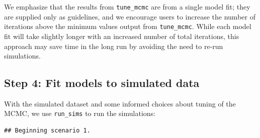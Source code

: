 \documentclass[
]{article}
\newenvironment{Shaded}{\begin{snugshade}}{\end{snugshade}}
\newcommand{\AttributeTok}[1]{\textcolor[rgb]{0.13,0.29,0.53}{#1}}
\newcommand{\CommentTok}[1]{\textcolor[rgb]{0.56,0.35,0.01}{\textit{#1}}}
\newcommand{\ConstantTok}[1]{\textcolor[rgb]{0.56,0.35,0.01}{#1}}
\newcommand{\DecValTok}[1]{\textcolor[rgb]{0.00,0.00,0.81}{#1}}
\newcommand{\FunctionTok}[1]{\textcolor[rgb]{0.13,0.29,0.53}{\textbf{#1}}}
\newcommand{\NormalTok}[1]{#1}
\newcommand{\OtherTok}[1]{\textcolor[rgb]{0.56,0.35,0.01}{#1}}
\newcommand{\SpecialCharTok}[1]{\textcolor[rgb]{0.81,0.36,0.00}{\textbf{#1}}}
\newcommand{\StringTok}[1]{\textcolor[rgb]{0.31,0.60,0.02}{#1}}
\begin{document}
We emphasize that the results from \texttt{tune\_mcmc} are from a single model fit; they are supplied only as guidelines, and we encourage users to increase the number of iterations above the minimum values output from \texttt{tune\_mcmc}. While each model fit will take slightly longer with an increased number of total iterations, this approach may save time in the long run by avoiding the need to re-run simulations.

\subsection{\texorpdfstring{Step 4: Fit models to simulated data \label{runSims}}{Step 4: Fit models to simulated data }}\label{step-4-fit-models-to-simulated-data}

With the simulated dataset and some informed choices about tuning of the MCMC, we use \texttt{run\_sims} to run the simulations:

\linespread{1}

\begin{Shaded}
\end{Shaded}

\begin{verbatim}
## Beginning scenario 1.
\end{verbatim}
\end{document}
